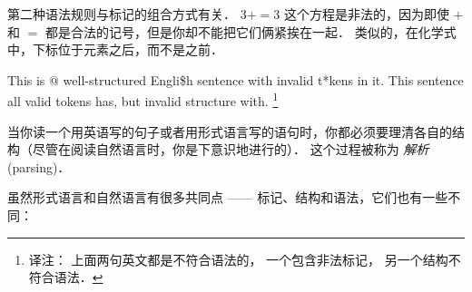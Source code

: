 
第二种语法规则与标记的组合方式有关．  $3 + = 3$ 这个方程是非法的，因为即使 $+$ 和 $=$ 都是合法的记号，但是你却不能把它们俩紧挨在一起． 类似的，在化学式中，下标位于元素之后，而不是之前．

This is @ well-structured Engli\$h
sentence with invalid t*kens in it.  This sentence all valid tokens
has, but invalid structure with.
\footnote{译注： 上面两句英文都是不符合语法的， 一个包含非法标记， 另一个结构不符合语法． }


当你读一个用英语写的句子或者用形式语言写的语句时，你都必须要理清各自的结构（尽管在阅读自然语言时，你是下意识地进行的）． 这个过程被称为 {\em 解析} (parsing)．
  


虽然形式语言和自然语言有很多共同点 —— 标记、结构和语法，它们也有一些不同：
    


